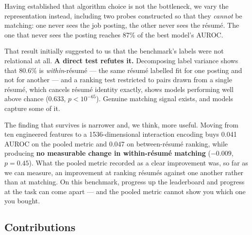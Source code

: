 \documentclass[11pt]{article}                      %
\begin{document}
Having established that algorithm choice is not the bottleneck, we vary the
representation instead, including two probes constructed so that they
\emph{cannot} be matching: one never sees the job posting, the other never sees
the résumé. The one that never sees the posting reaches 87\% of the best model's
AUROC.

That result initially suggested to us that the benchmark's labels were not
relational at all. \textbf{A direct test refutes it.} Decomposing label variance
shows that 80.6\% is \emph{within}-résumé --- the same résumé labelled fit for one
posting and not for another --- and a ranking test restricted to pairs drawn from a
single résumé, which cancels résumé identity exactly, shows models performing
well above chance (0.633, $p < 10^{-65}$). Genuine matching signal exists, and
models capture some of it.

The finding that survives is narrower and, we think, more useful. Moving from ten
engineered features to a 1536-dimensional interaction encoding buys 0.041 AUROC
on the pooled metric and 0.047 on between-résumé ranking, while producing
\textbf{no measurable change in within-résumé matching} ($-0.009$, $p = 0.45$).
What the pooled metric recorded as a clear improvement was, so far as we can
measure, an improvement at ranking résumés against one another rather than at
matching. On this benchmark, progress up the leaderboard and progress at the task
can come apart --- and the pooled metric cannot show you which one you bought.

\subsection{Contributions}
\end{document}
